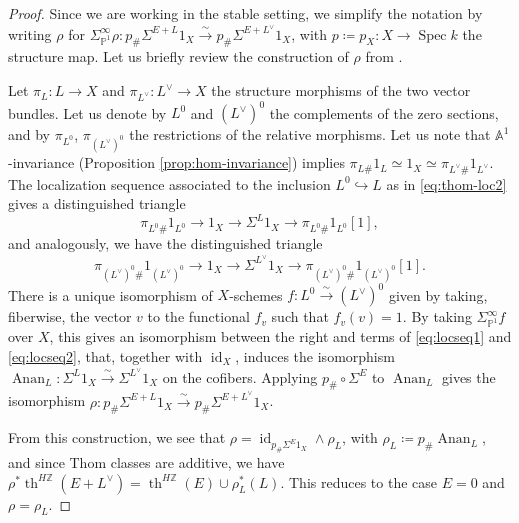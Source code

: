 \documentclass[10pt]{amsart}
\theoremstyle{definition}
\theoremstyle{plain}
\numberwithin{equation}{section}
\newcommand{\0}{\emptyset}
\newcommand{\A}{{\mathbb A}}
\renewcommand{\P}{{\mathbb P}}
\newcommand{\Z}{{\mathbb Z}}
\newcommand{\Spec}{{\operatorname{Spec}}}
\renewcommand{\th}{{\operatorname{th}}}
\newcommand{\id}{{\operatorname{id}}}
\newcommand{\Anan}{{\operatorname{Anan}}}
\begin{document}
\begin{proof}
    Since we are working in the stable setting, we simplify the notation by writing $\rho$ for $\Sigma^{\infty}_{\P^1}\rho:p_\#\Sigma^{E +L}1_X \xrightarrow{\sim} p_\#\Sigma^{E+L^\vee}1_X$, with $p\coloneqq p_X:X \to \Spec k$ the structure map. Let us briefly review the construction of $\rho$ from \cite{Ana:Slor}.

    Let $\pi_L:L\to X$ and $\pi_{L^\vee}:L^\vee \to X$ the structure morphisms of the two vector bundles. Let us denote by $L^0$ and $(L^\vee)^0$ the complements of the zero sections, and by $\pi_{L^0}$, $\pi_{(L^\vee)^0}$ the restrictions of the relative morphisms. Let us note that $\A^1$-invariance (Proposition \ref{prop:hom-invariance}) implies $\pi_{L\#}1_L \simeq 1_X \simeq \pi_{L^\vee \#}1_{L^\vee}$. The localization sequence associated to the inclusion $L^0 \hookrightarrow L$ as in \eqref{eq:thom-loc2} gives a distinguished triangle 
    \begin{equation}
    \label{eq:locseq1}
        \pi_{L^0\#}1_{L^0} \to 1_X \to \Sigma^L1_X \to \pi_{L^0\#}1_{L^0}[1], 
    \end{equation}
    and analogously, we have the distinguished triangle
    \begin{equation}
    \label{eq:locseq2}
        \pi_{(L^\vee)^0\#}1_{(L^\vee)^0} \to 1_X \to \Sigma^{L^\vee}1_X \to \pi_{(L^\vee)^0\#}1_{(L^\vee)^0}[1].
    \end{equation}
    There is a unique isomorphism of $X$-schemes $f:L^0\xrightarrow{\sim}(L^{\vee})^0$ given by taking, fiberwise, the vector $v$ to the functional $f_v$ such that $f_v(v)=1$. By taking $\Sigma_{\P^1}^\infty f$ over $X$, this gives an isomorphism between the right and terms of \eqref{eq:locseq1} and \eqref{eq:locseq2}, that, together with $\id_X$, induces the isomorphism $\Anan_L:\Sigma^L1_X \xrightarrow{\sim} \Sigma^{L^\vee}1_X$ on the cofibers. Applying $p_\# \circ \Sigma^E$ to $\Anan_L$ gives the isomorphism $\rho: p_\#\Sigma^{E+L}1_X \xrightarrow{\sim} p_\#\Sigma^{E +L^\vee}1_X$.

    From this construction, we see that $\rho=\id_{p_\# \Sigma^E1_X}\wedge \rho_L$, with $\rho_L \coloneqq p_\# \Anan_L$, and since Thom classes are additive, we have $\rho^*\th^{H\mathbb{Z}}(E + L^{\vee})=\th^{H\Z}(E) \cup \rho_L^*(L)$. This reduces to the case $E=0$ and $\rho=\rho_L$.


\end{proof}
\end{document}
